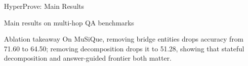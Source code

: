 \begin{frame}{HyperProve: Main Results}
\scriptsize
\begin{block}{Main results on multi-hop QA benchmarks}
\centering
{}
\end{block}
\begin{block}{Ablation takeaway}
On MuSiQue, removing bridge entities drops accuracy from 71.60 to 64.50; removing decomposition drops it to 51.28, showing that stateful decomposition and answer-guided frontier both matter.
\end{block}
\end{frame}
